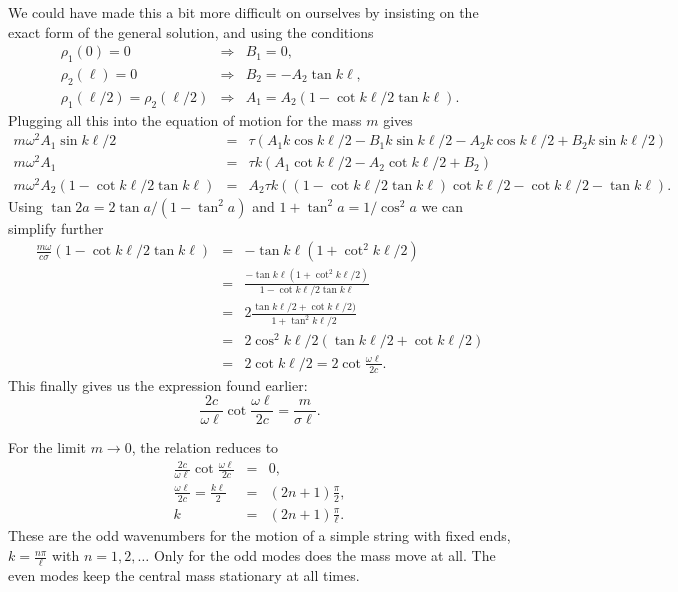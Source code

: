 \documentclass[letterpaper,11pt]{article}
\begin{document}
We could have made this a bit more difficult on ourselves by insisting on the exact form of the general solution, and using the conditions
\begin{eqnarray*}
 \rho_1(0) = 0 & \Rightarrow & B_1 = 0, \\
 \rho_2(\ell) = 0 & \Rightarrow & B_2 = -A_2 \tan k\ell, \\
 \rho_1(\ell/2) = \rho_2(\ell/2) & \Rightarrow & A_1 = A_2 (1 - \cot k\ell/2 \tan k\ell).
\end{eqnarray*}
Plugging all this into the equation of motion for the mass $m$ gives
\begin{eqnarray*}
 m \omega^2 A_1 \sin k\ell/2 & = & \tau \left(A_1 k \cos k\ell/2 - B_1 k \sin k\ell/2 - A_2 k \cos k\ell/2 + B_2 k \sin k\ell/2 \right) \\
 m \omega^2 A_1 & = & \tau k \left( A_1 \cot k\ell/2 - A_2 \cot k\ell/2 + B_2 \right) \\
 m \omega^2 A_2 (1 - \cot k\ell/2 \tan k\ell) & = & A_2 \tau k \left( \left(1 - \cot k\ell/2 \tan k\ell\right) \cot k\ell/2 - \cot k\ell/2 - \tan k\ell \right).
\end{eqnarray*}
Using $\tan 2 a = 2 \tan a / (1 - \tan^2 a)$ and $1 + \tan^2 a = 1 / \cos^2 a$ we can simplify further
\begin{eqnarray*}
 \frac{m \omega}{c \sigma} (1 - \cot k\ell/2 \tan k\ell) & = & - \tan k\ell ( 1 + \cot^2 k\ell/2) \\
 & = & \frac{- \tan k\ell ( 1 + \cot^2 k\ell/2)}{1 - \cot k\ell/2 \tan k\ell} \\
 & = & 2 \frac{\tan k\ell/2 + \cot k\ell/2)}{1 + \tan^2 k\ell/2} \\
 & = & 2 \cos^2 k\ell/2 (\tan k\ell/2 + \cot k\ell/2) \\
 & = & 2 \cot k\ell/2 = 2 \cot \frac{\omega \ell}{2 c}.
\end{eqnarray*}
This finally gives us the expression found earlier:
\begin{equation*}
 \frac{2 c}{\omega \ell} \cot \frac{\omega \ell}{2 c} = \frac{m}{\sigma \ell}.
\end{equation*}

For the limit $m \to 0$, the relation reduces to
\begin{eqnarray*}
 \frac{2 c}{\omega \ell} \cot \frac{\omega \ell}{2 c} & = & 0, \\
 \frac{\omega \ell}{2 c} = \frac{k\ell}{2} & = & (2 n + 1) \frac{\pi}{2}, \\
 k & = & (2 n + 1) \frac{\pi}{\ell}.
\end{eqnarray*}
These are the odd wavenumbers for the motion of a simple string with fixed ends, $k = \frac{n \pi}{\ell}$ with $n = 1, 2,\ldots$  Only for the odd modes does the mass move at all.  The even modes keep the central mass stationary at all times.
\end{document}
